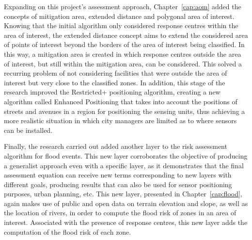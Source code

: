 Expanding on this project's assessment approach, Chapter~\ref{cap:aom} added the concepts of mitigation area, extended distance and polygonal area of interest. Knowing that the initial algorithm only considered response centres within the area of interest, the extended distance concept aims to extend the considered area of points of interest beyond the borders of the area of interest being classified. In this way, a mitigation area is created in which response centres outside the area of interest, but still within the mitigation area, can be considered. This solved a recurring problem of not considering facilities that were outside the area of interest but very close to the classified zones. In addition, this stage of the research improved the Restricted+ positioning algorithm, creating a new algorithm called Enhanced Positioning that takes into account the positions of streets and avenues in a region for positioning the sensing units, thus achieving a more realistic situation in which city managers are limited as to where sensors can be installed.


Finally, the research carried out added another layer to the risk assessment algorithm for flood events. This new layer corroborates the objective of producing a generalist approach even with a specific layer, as it demonstrates that the final assessment equation can receive new terms corresponding to new layers with different goals, producing results that can also be used for sensor positioning purposes, urban planning, etc. This new layer, presented in Chapter~\ref{cap:flood}, again makes use of public and open data on terrain elevation and slope, as well as the location of rivers, in order to compute the flood risk of zones in an area of interest. Associated with the presence of response centres, this new layer adds the computation of the flood risk of each zone.


